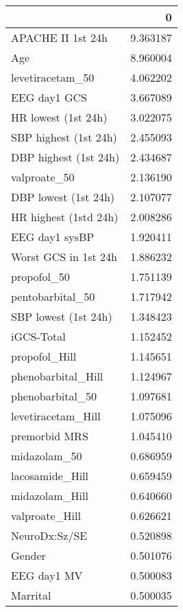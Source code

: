 \begin{tabular}{lr}
\toprule
{} &         0 \\
\midrule
APACHE II 1st 24h              &  9.363187 \\
Age                            &  8.960004 \\
levetiracetam\_50               &  4.062202 \\
EEG day1 GCS                   &  3.667089 \\
HR lowest (1st 24h)            &  3.022075 \\
SBP highest (1st 24h)          &  2.455093 \\
DBP highest (1st 24h)          &  2.434687 \\
valproate\_50                   &  2.136190 \\
DBP lowest (1st 24h)           &  2.107077 \\
HR highest (1std 24h)          &  2.008286 \\
EEG day1 sysBP                 &  1.920411 \\
Worst GCS in 1st 24h           &  1.886232 \\
propofol\_50                    &  1.751139 \\
pentobarbital\_50               &  1.717942 \\
SBP lowest (1st 24h)           &  1.348423 \\
iGCS-Total                     &  1.152452 \\
propofol\_Hill                  &  1.145651 \\
phenobarbital\_Hill             &  1.124967 \\
phenobarbital\_50               &  1.097681 \\
levetiracetam\_Hill             &  1.075096 \\
premorbid MRS                  &  1.045410 \\
midazolam\_50                   &  0.686959 \\
lacosamide\_Hill                &  0.659459 \\
midazolam\_Hill                 &  0.640660 \\
valproate\_Hill                 &  0.626621 \\
NeuroDx:Sz/SE                  &  0.520898 \\
Gender                         &  0.501076 \\
EEG day1 MV                    &  0.500083 \\
Marrital                       &  0.500035 \\

\end{tabular}
